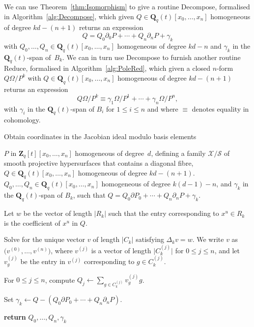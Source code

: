 \documentclass[a4paper,11pt]{article}
\numberwithin{equation}{section}
\providecommand{\abs}[1]{\lvert#1\rvert}                 %
\newcommand{\ZZ}{\mathbf{Z}} %
\newcommand{\QQ}{\mathbf{Q}} %
\theoremstyle{definition}
\begin{document}
We can use Theorem~\ref{thm:Isomorphism} to give a routine {\sc Decompose}, 
formalised in Algorithm~\ref{alg:Decompose}, which given 
$Q \in \QQ_q(t)[x_0, \dotsc, x_n]$ homogeneous of degree $kd - (n+1)$
returns an expression 
\begin{equation*}
Q = Q_0 \partial_0 P + \dotsb + Q_n \partial_n P + \gamma_k
\end{equation*} 
with $Q_0, \dotsc, Q_n \in \QQ_q(t)[x_0, \dotsc, x_n]$ homogeneous of 
degree $kd-n$ and $\gamma_k$ in the $\QQ_q(t)$-span of~$B_k$. We can in turn 
use {\sc Decompose} to furnish another routine {\sc Reduce}, formalised 
in Algorithm~\ref{alg:PoleRed}, which given a closed $n$-form $Q\Omega/P^k$ 
with $Q \in \QQ_q(t)[x_0, \dotsc, x_n]$ homogeneous of degree $kd - (n+1)$ returns 
an expression
\begin{equation*}
Q \Omega / P^k \equiv \gamma_{1} \Omega / P^{1} + \dotsb + \gamma_n \Omega / P^n,
\end{equation*}
with $\gamma_i$ in the $\QQ_q(t)$-span of $B_i$ for $1 \leq i \leq n$ and 
where $\equiv$ denotes equality in cohomology.


\begin{algorithm}
\caption{Obtain coordinates in the Jacobian ideal modulo basis elements}
\label{alg:Decompose}
\begin{algorithmic}
\Require $P$ in $\ZZ_q[t][x_0, \dotsc, x_n]$ homogeneous of degree~$d$, 
         defining a family $\mathcal{X}/\mathcal{S}$ of smooth projective 
         hypersurfaces that contains a diagonal fibre, 
         $Q \in \QQ_q(t)[x_0, \dotsc, x_n]$ homogeneous of degree $kd - (n+1)$.
\Ensure  $Q_0, \dotsc, Q_n \in \QQ_q(t)[x_0, \dotsc, x_n]$ homogeneous of degree 
         $k(d-1)-n$, and $\gamma_k$ in the $\QQ_q(t)$-span of $B_k$, such that 
         $Q = Q_0 \partial P_0 + \dotsb + Q_n \partial_n P +\gamma_k$.
\State \begin{compactenum}[{\hspace{1em}} 1.] \vspace{-1.24em}
\item Let $w$ be the vector of length $\abs{R_k}$ such that the entry 
      corresponding to $x^u \in R_k$ is the coefficient of 
      $x^u$ in $Q$.
\item Solve for the unique vector $v$ of length $\abs{C_k}$ satisfying 
      $\Delta_k v = w$.  We write $v$ 
      as $\bigl(v^{(0)}, \dotsc, v^{(n)}\bigr)$, where $v^{(j)}$ is 
      a vector of length $\abs{C_k^{(j)}}$ for $0 \leq j \leq n$,
      and let $v_g^{(j)}$ be the entry in $v^{(j)}$ corresponding 
      to $g \in C_k^{(j)}$.
\item For $0 \leq j \leq n$, compute $Q_j \gets \sum_{g \in C_k^{(j)}} v_g^{(j)} g$.
\item Set $\gamma_k \gets Q-(Q_0 \partial P_0 + \dotsb + Q_n \partial_n P)$.
\item \textbf{return} $Q_0, \dotsc, Q_n,\gamma_k$      
\EndProcedure
\end{compactenum}
\end{algorithmic}
\end{algorithm}
\end{document}
